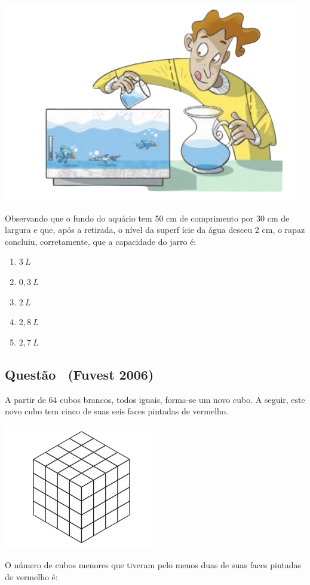 \documentclass[12pt]{article}
\newcounter{questao}
\newcommand{\novaquestao}[1]{%
  \stepcounter{questao}%
  \subsection*{Questão \thequestao\ (#1)}%
}
\begin{document}
\begin{multicols}{2}
            \begin{center}
                \includegraphics[scale=0.5]{paiva-aquario.png}
            \end{center} Observando que o fundo do aquário tem 50 cm de
            comprimento por 30 cm de largura e que, após a
            retirada, o nível da superf ície da água desceu 2 cm,
            o rapaz concluiu, corretamente, que a capacidade
            do jarro é:

            \begin{enumerate}[label=(\alph*), noitemsep]
                \item $3\ L$ %
                \item $0,3\  L$
                \item $2\ L$
                \item $2,8\ L$
                \item $2,7\  L$
            \end{enumerate}

        \novaquestao{Fuvest 2006}

            A partir de 64 cubos brancos, todos iguais, forma-se um novo cubo. A seguir, este novo cubo tem cinco de suas seis faces pintadas de vermelho.

            \begin{center}
                \includegraphics[scale=0.7]{fuvest-cubo.png}
            \end{center} O número de cubos menores que tiveram pelo menos duas de suas faces pintadas de vermelho é:


\end{multicols}
\end{document}
